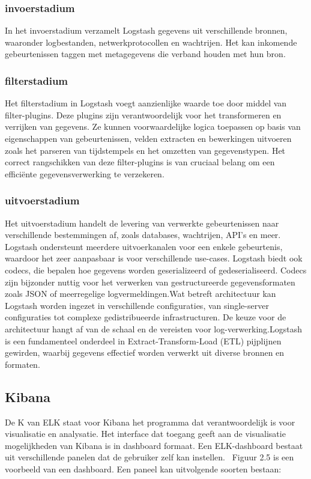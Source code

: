 \subsubsection{invoerstadium}
In het invoerstadium verzamelt Logstash gegevens uit verschillende bronnen, waaronder logbestanden, netwerkprotocollen en wachtrijen. Het kan inkomende gebeurtenissen taggen met metagegevens die verband houden met hun bron.

\subsubsection{filterstadium}
Het filterstadium in Logstash voegt aanzienlijke waarde toe door middel van filter-plugins. Deze plugins zijn verantwoordelijk voor het transformeren en verrijken van gegevens. Ze kunnen voorwaardelijke logica toepassen op basis van eigenschappen van gebeurtenissen, velden extracten en bewerkingen uitvoeren zoals het parseren van tijdstempels en het omzetten van gegevenstypen. Het correct rangschikken van deze filter-plugins is van cruciaal belang om een efficiënte gegevensverwerking te verzekeren.

\subsubsection{uitvoerstadium}
Het uitvoerstadium handelt de levering van verwerkte gebeurtenissen naar verschillende bestemmingen af, zoals databases, wachtrijen, API's en meer. Logstash ondersteunt meerdere uitvoerkanalen voor een enkele gebeurtenis, waardoor het zeer aanpasbaar is voor verschillende use-cases. Logstash biedt ook codecs, die bepalen hoe gegevens worden geserializeerd of gedeserialiseerd. Codecs zijn bijzonder nuttig voor het verwerken van gestructureerde gegevensformaten zoals JSON of meerregelige logvermeldingen.Wat betreft architectuur kan Logstash worden ingezet in verschillende configuraties, van single-server configuraties tot complexe gedistribueerde infrastructuren. De keuze voor de architectuur hangt af van de schaal en de vereisten voor log-verwerking.Logstash is een fundamenteel onderdeel in Extract-Transform-Load (ETL) pijplijnen gewirden, waarbij gegevens effectief worden verwerkt uit diverse bronnen en formaten.

\subsection{Kibana}
De K van ELK staat voor Kibana het programma dat verantwoordelijk is voor visualisatie en analysatie. Het interface dat toegang geeft aan de visualisatie mogelijkheden van Kibana is in dashboard formaat. Een ELK-dashboard bestaat uit verschillende panelen dat de gebruiker zelf kan instellen.~\autocite{Elatic(1)} Figuur 2.5 is een voorbeeld van een dashboard. Een paneel kan uitvolgende soorten bestaan:

